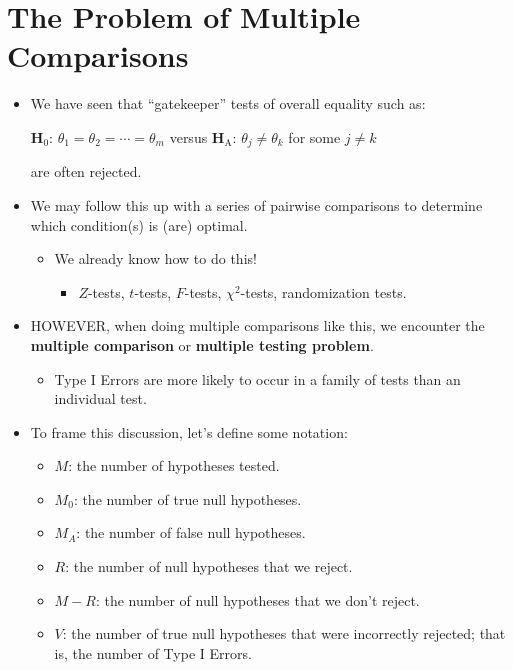 \section{The Problem of Multiple Comparisons}
\begin{itemize}
    \item We have seen that ``gatekeeper'' tests of overall equality such as:
          \begin{tightcenter}
              $ \mathbf{H}_0 $: $ \theta_1=\theta_2=\cdots=\theta_m $ versus $ \mathbf{H}_\text{A} $: $ \theta_j\ne \theta_k $ for some $ j\ne k $
          \end{tightcenter}
          are often rejected.
    \item We may follow this up with a series of pairwise comparisons to determine which condition(s) is (are)
          optimal.
          \begin{itemize}
              \item We already know how to do this!
                    \begin{itemize}
                        \item $ Z $-tests, $ t $-tests, $ F $-tests, $ \chi^2 $-tests, randomization tests.
                    \end{itemize}
          \end{itemize}
    \item HOWEVER, when doing multiple comparisons like this, we encounter the \textbf{multiple comparison} or
          \textbf{multiple testing problem}.
          \begin{itemize}
              \item Type I Errors are more likely to occur in a family of tests than an individual test.
          \end{itemize}
    \item To frame this discussion, let's define some notation:
          \begin{itemize}
              \item $ M $: the number of hypotheses tested.
              \item $ M_0 $: the number of true null hypotheses.
              \item $ M_A $: the number of false null hypotheses.
              \item $ R $: the number of null hypotheses that we reject.
              \item $ M-R $: the number of null hypotheses that we don't reject.
              \item $ V $: the number of true null hypotheses that were incorrectly rejected; that is, the number of Type I Errors.

\end{itemize}
\end{itemize}

